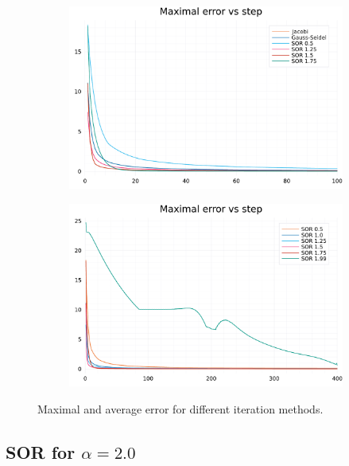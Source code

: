 \documentclass[
	a4paper, %
	10pt, %
]{CSUniSchoolLabReport}
\begin{document}
\begin{figure}[H]
\begin{subfigure}[b]{0.49\textwidth}
			\label{fig:av_errors_SOR}
	\end{subfigure}
	\hfill
	\begin{subfigure}[b]{0.49\textwidth}
			\centering
			\includegraphics[width=\textwidth]{../saves/max_errors_comp.pdf}

			\label{fig:max_errors}
	\end{subfigure}
	\hfill
	\begin{subfigure}[b]{0.49\textwidth}
		\centering
		\includegraphics[width=\textwidth]{../saves/max_errors_SOR_comp.pdf}

		\label{fig:max_errors_SOR}
\end{subfigure}
		 \caption{Maximal and average error for different iteration methods.}
		 \label{fig:errors}
\end{figure}

\subsection{SOR for $\alpha=2.0$}
\end{document}
